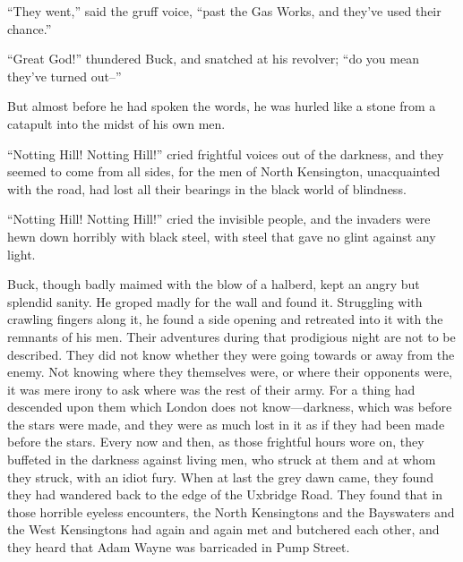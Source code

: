 \documentclass{book}
\begin{document}
“They went,” said the gruff voice, “past the Gas Works, and they’ve used their chance.”

“Great God!” thundered Buck, and snatched at his revolver; “do you mean they’ve turned out–”

But almost before he had spoken the words, he was hurled like a stone from a catapult into the midst of his own men.

“Notting Hill! Notting Hill!” cried frightful voices out of the darkness, and they seemed to come from all sides, for the men of North Kensington, unacquainted with the road, had lost all their bearings in the black world of blindness.

“Notting Hill! Notting Hill!” cried the invisible people, and the invaders were hewn down horribly with black steel, with steel that gave no glint against any light.

Buck, though badly maimed with the blow of a halberd, kept an angry but splendid sanity. He groped madly for the wall and found it. Struggling with crawling fingers along it, he found a side opening and retreated into it with the remnants of his men. Their adventures during that prodigious night are not to be described. They did not know whether they were going towards or away from the enemy. Not knowing where they themselves were, or where their opponents were, it was mere irony to ask where was the rest of their army. For a thing had descended upon them which London does not know—darkness, which was before the stars were made, and they were as much lost in it as if they had been made before the stars. Every now and then, as those frightful hours wore on, they buffeted in the darkness against living men, who struck at them and at whom they struck, with an idiot fury. When at last the grey dawn came, they found they had wandered back to the edge of the Uxbridge Road. They found that in those horrible eyeless encounters, the North Kensingtons and the Bayswaters and the West Kensingtons had again and again met and butchered each other, and they heard that Adam Wayne was barricaded in Pump Street.
\end{document}
